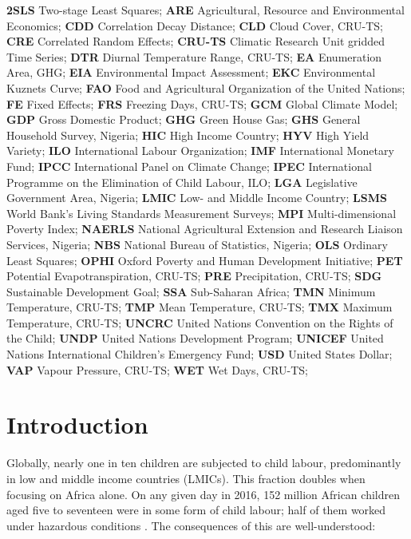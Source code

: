 \documentclass[a4paper,12pt]{article}
\theoremstyle{plain}
\theoremstyle{definition}
\theoremstyle{definition}
\theoremstyle{definition}
\theoremstyle{definition}
\begin{document}
\textbf{2SLS} Two-stage Least Squares; 
\textbf{ARE} Agricultural, Resource and Environmental Economics; 
\textbf{CDD} Correlation Decay Distance; 
\textbf{CLD} Cloud Cover, CRU-TS; 
\textbf{CRE} Correlated Random Effects; 
\textbf{CRU-TS} Climatic Research Unit gridded Time Series; 
\textbf{DTR} Diurnal Temperature Range, CRU-TS; 
\textbf{EA} Enumeration Area, GHG; 
\textbf{EIA} Environmental Impact Assessment; 
\textbf{EKC} Environmental Kuznets Curve; 
\textbf{FAO} Food and Agricultural Organization of the United Nations; 
\textbf{FE} Fixed Effects; 
\textbf{FRS} Freezing Days, CRU-TS; 
\textbf{GCM} Global Climate Model; 
\textbf{GDP} Gross Domestic Product; 
\textbf{GHG} Green House Gas; 
\textbf{GHS} General Household Survey, Nigeria; 
\textbf{HIC} High Income Country; 
\textbf{HYV} High Yield Variety; 
\textbf{ILO} International Labour Organization; 
\textbf{IMF} International Monetary Fund; 
\textbf{IPCC} International Panel on Climate Change; 
\textbf{IPEC} International Programme on the Elimination of Child Labour, ILO; 
\textbf{LGA} Legislative Government Area, Nigeria; 
\textbf{LMIC} Low- and Middle Income Country; 
\textbf{LSMS} World Bank's Living Standards Measurement Surveys; 
\textbf{MPI} Multi-dimensional Poverty Index; 
\textbf{NAERLS} National Agricultural Extension and Research Liaison Services, Nigeria; 
\textbf{NBS} National Bureau of Statistics, Nigeria; 
\textbf{OLS} Ordinary Least Squares; 
\textbf{OPHI} Oxford Poverty and Human Development Initiative; 
\textbf{PET} Potential Evapotranspiration, CRU-TS; 
\textbf{PRE} Precipitation, CRU-TS; 
\textbf{SDG} Sustainable Development Goal; 
\textbf{SSA} Sub-Saharan Africa; 
\textbf{TMN} Minimum Temperature, CRU-TS; 
\textbf{TMP} Mean Temperature, CRU-TS; 
\textbf{TMX} Maximum Temperature, CRU-TS; 
\textbf{UNCRC} United Nations Convention on the Rights of the Child; 
\textbf{UNDP} United Nations Development Program; 
\textbf{UNICEF} United Nations International Children's Emergency Fund; 
\textbf{USD} United States Dollar; 
\textbf{VAP} Vapour Pressure, CRU-TS; 
\textbf{WET} Wet Days, CRU-TS;
\clearpage

\tableofcontents

\section{Introduction}
\label{intro}

Globally, nearly one in ten children are subjected to child labour, predominantly in low and middle income countries (LMICs). This fraction doubles when focusing on Africa alone. On any given day in 2016, 152 million African children aged five to seventeen were in some form of child labour; half of them worked under hazardous conditions \citep{ILO2017}. The consequences of this are well-understood:
\end{document}
